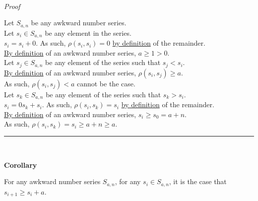 \documentclass[a4paper,12pt]{article}
\begin{document}
\noindent \\
\textit{Proof}

\noindent Let $S_{a, n}$ be any awkward number series.\\

\noindent Let $s_i \in S_{a, n}$ be any element in the series.\\

\noindent $s_i = s_i + 0$. As such, $\rho(s_i, s_i) = 0$ \hyperlink{theorem:remainder_theorem}{by definition} of the remainder.\\

\noindent \hyperlink{definition:awkward_number_series}{By definition} of an awkward number series, $a \geq 1 > 0$.\\

\noindent Let $s_j \in S_{a, n}$ be any element of the series such that $s_j < s_i$.\\

\noindent \hyperlink{definition:awkward_number_series}{By definition} of an awkward number series, $\rho(s_i, s_j) \geq a$.\\

\noindent As such, $\rho(s_i, s_j) < a$ cannot be the case.\\

\noindent Let $s_k \in S_{a, n}$ be any element of the series such that $s_k > s_i$.\\

\noindent $s_i = 0s_k + s_i$. As such, $\rho(s_i, s_k) = s_i$ \hyperlink{theorem:remainder_theorem}{by definition} of the remainder.\\

\noindent \hyperlink{definition:awkward_number_series}{By definition} of an awkward number series, $s_i \geq s_0 = a + n$.\\

\noindent As such, $\rho(s_i, s_k) = s_i \geq a + n \geq a$.

\begin{center}
\noindent\rule{8cm}{0.4pt}
\end{center}
\noindent \\






\label{corollary:non_divisibility_of_elements}
\hypertarget{corollary:non_divisibility_of_elements}{}
\begin{tcolorbox}
\textbf{Corollary}

For any awkward number series $S_{a, n}$, for any $s_i \in S_{a, n}$, it is the case that $s_{i + 1} \geq s_i + a$.
\end{tcolorbox}
\end{document}
